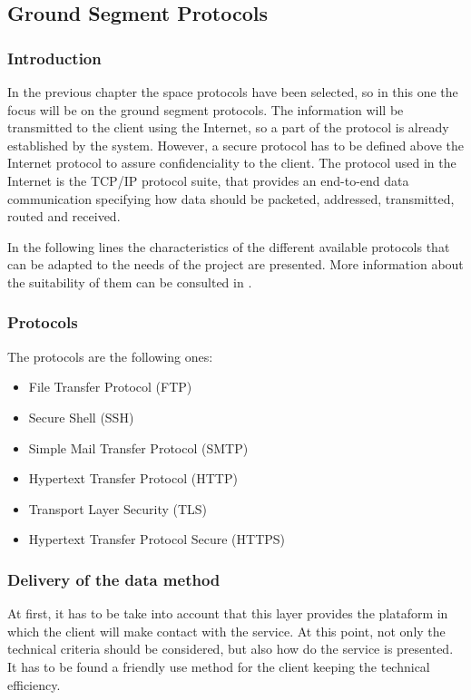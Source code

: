 \subsection{Ground Segment Protocols}

\subsubsection{Introduction}
In the previous chapter the space protocols have been selected, so in this one the focus will be on the ground segment protocols. The information will be transmitted to the client using the Internet, so a part of the protocol is already established by the system. However, a secure protocol has to be defined above the Internet protocol to assure confidenciality to the client. The protocol used in the Internet is the TCP/IP protocol suite, that provides an end-to-end data communication specifying how data should be packeted, addressed, transmitted, routed and received.

In the following lines the characteristics of the different available protocols that can be adapted to the needs of the project are presented. More information about the suitability of them can be consulted in \cite[Chapter 2, Section 2]{annex3}.

\subsubsection{Protocols}
The protocols are the following ones:
\begin{itemize}
\item File Transfer Protocol (FTP)
\item Secure Shell (SSH)
\item Simple Mail Transfer Protocol (SMTP)
\item Hypertext Transfer Protocol (HTTP)
\item Transport Layer Security (TLS)
\item Hypertext Transfer Protocol Secure (HTTPS)
\end{itemize} 

\subsubsection{Delivery of the data method} 
At first, it has to be take into account that this layer provides the plataform in which the client will make contact with the service. At this point, not only the technical criteria should be considered, but also how do the service is presented. It has to be found a friendly use method for the client keeping the technical efficiency.


